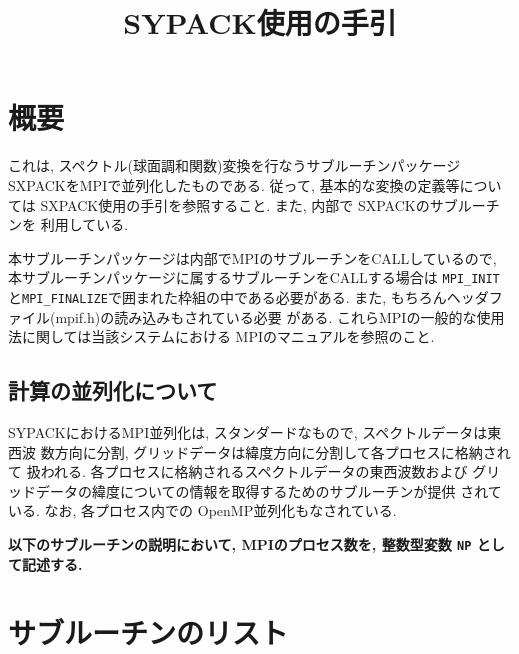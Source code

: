 \documentclass[a4j]{jsarticle}
\title{SYPACK使用の手引}
\author{}
\date{}
\begin{document}
\maketitle

\section{概要}

これは, スペクトル(球面調和関数)変換を行なうサブルーチンパッケージ
SXPACKをMPIで並列化したものである.
従って, 基本的な変換の定義等については
SXPACK使用の手引を参照すること. また, 内部で SXPACKのサブルーチンを
利用している.

本サブルーチンパッケージは内部でMPIのサブルーチンをCALLしているので,
本サブルーチンパッケージに属するサブルーチンをCALLする場合は
\texttt{MPI\_INIT}と\texttt{MPI\_FINALIZE}で囲まれた枠組の中である必要がある.
また, もちろんヘッダファイル(mpif.h)の読み込みもされている必要
がある. これらMPIの一般的な使用法に関しては当該システムにおける
MPIのマニュアルを参照のこと.

\subsection{計算の並列化について}

SYPACKにおけるMPI並列化は, スタンダードなもので, スペクトルデータは東西波
数方向に分割, グリッドデータは緯度方向に分割して各プロセスに格納されて
扱われる. 各プロセスに格納されるスペクトルデータの東西波数および
グリッドデータの緯度についての情報を取得するためのサブルーチンが提供
されている. なお, 各プロセス内での OpenMP並列化もなされている.

\textbf{以下のサブルーチンの説明において, MPIのプロセス数を, 整数型変数
\texttt{NP} として記述する.}



\section{サブルーチンのリスト}
\end{document}
